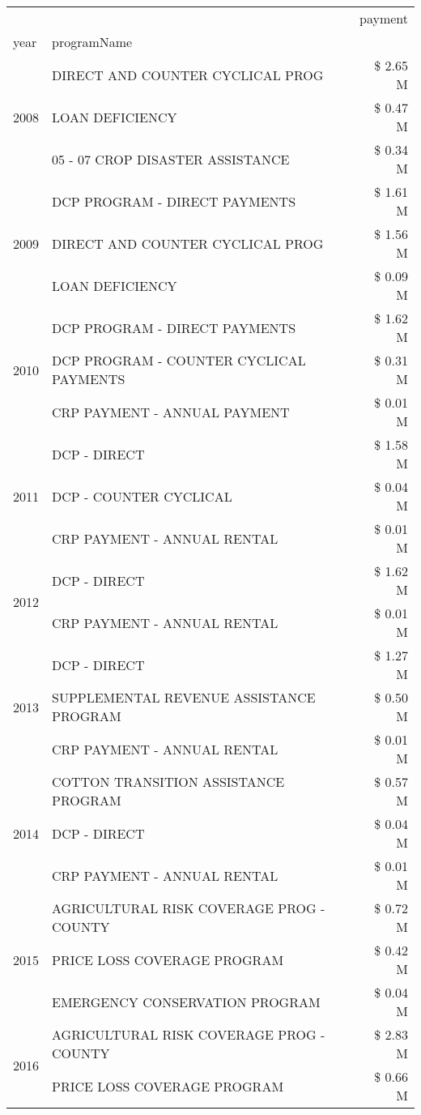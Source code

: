 \begin{tabular}{llr}
\toprule
 &  & payment \\
year & programName &  \\
\midrule
\multirow[t]{3}{*}{2008} & DIRECT AND COUNTER CYCLICAL PROG & \$ 2.65 M \\
 & LOAN DEFICIENCY & \$ 0.47 M \\
 & 05 - 07 CROP DISASTER ASSISTANCE & \$ 0.34 M \\
\cline{1-3}
\multirow[t]{3}{*}{2009} & DCP PROGRAM - DIRECT PAYMENTS & \$ 1.61 M \\
 & DIRECT AND COUNTER CYCLICAL PROG & \$ 1.56 M \\
 & LOAN DEFICIENCY & \$ 0.09 M \\
\cline{1-3}
\multirow[t]{3}{*}{2010} & DCP PROGRAM - DIRECT PAYMENTS & \$ 1.62 M \\
 & DCP PROGRAM - COUNTER CYCLICAL PAYMENTS & \$ 0.31 M \\
 & CRP PAYMENT - ANNUAL PAYMENT & \$ 0.01 M \\
\cline{1-3}
\multirow[t]{3}{*}{2011} & DCP - DIRECT & \$ 1.58 M \\
 & DCP - COUNTER CYCLICAL & \$ 0.04 M \\
 & CRP PAYMENT - ANNUAL RENTAL & \$ 0.01 M \\
\cline{1-3}
\multirow[t]{2}{*}{2012} & DCP - DIRECT & \$ 1.62 M \\
 & CRP PAYMENT - ANNUAL RENTAL & \$ 0.01 M \\
\cline{1-3}
\multirow[t]{3}{*}{2013} & DCP - DIRECT & \$ 1.27 M \\
 & SUPPLEMENTAL REVENUE ASSISTANCE PROGRAM & \$ 0.50 M \\
 & CRP PAYMENT - ANNUAL RENTAL & \$ 0.01 M \\
\cline{1-3}
\multirow[t]{3}{*}{2014} & COTTON TRANSITION ASSISTANCE PROGRAM & \$ 0.57 M \\
 & DCP - DIRECT & \$ 0.04 M \\
 & CRP PAYMENT - ANNUAL RENTAL & \$ 0.01 M \\
\cline{1-3}
\multirow[t]{3}{*}{2015} & AGRICULTURAL RISK COVERAGE PROG - COUNTY & \$ 0.72 M \\
 & PRICE LOSS COVERAGE PROGRAM & \$ 0.42 M \\
 & EMERGENCY CONSERVATION PROGRAM & \$ 0.04 M \\
\cline{1-3}
\multirow[t]{3}{*}{2016} & AGRICULTURAL RISK COVERAGE PROG - COUNTY & \$ 2.83 M \\
 & PRICE LOSS COVERAGE PROGRAM & \$ 0.66 M \\

\end{tabular}
